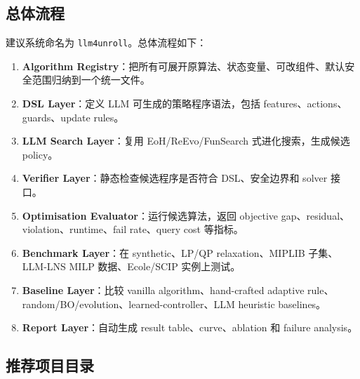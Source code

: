 \documentclass[12pt,a4paper]{ctexart}
\begin{document}
\subsection{总体流程}
建议系统命名为 \texttt{llm4unroll}。总体流程如下：
\begin{enumerate}
    \item \textbf{Algorithm Registry}：把所有可展开原算法、状态变量、可改组件、默认安全范围归纳到一个统一文件。
    \item \textbf{DSL Layer}：定义 LLM 可生成的策略程序语法，包括 features、actions、guards、update rules。
    \item \textbf{LLM Search Layer}：复用 EoH/ReEvo/FunSearch 式进化搜索，生成候选 policy。
    \item \textbf{Verifier Layer}：静态检查候选程序是否符合 DSL、安全边界和 solver 接口。
    \item \textbf{Optimisation Evaluator}：运行候选算法，返回 objective gap、residual、violation、runtime、fail rate、query cost 等指标。
    \item \textbf{Benchmark Layer}：在 synthetic、LP/QP relaxation、MIPLIB 子集、LLM-LNS MILP 数据、Ecole/SCIP 实例上测试。
    \item \textbf{Baseline Layer}：比较 vanilla algorithm、hand-crafted adaptive rule、random/BO/evolution、learned-controller、LLM heuristic baselines。
    \item \textbf{Report Layer}：自动生成 result table、curve、ablation 和 failure analysis。
\end{enumerate}

\subsection{推荐项目目录}
\end{document}
